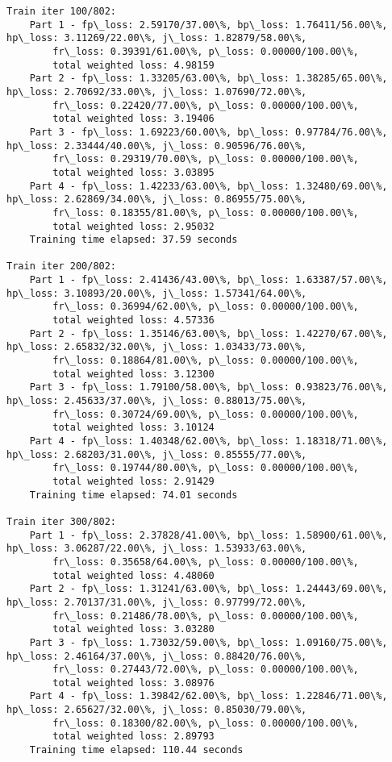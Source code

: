 \documentclass[11pt]{article}
\begin{document}
\begin{Verbatim}[commandchars=\\\{\}]
Train iter 100/802:
	Part 1 - fp\_loss: 2.59170/37.00\%, bp\_loss: 1.76411/56.00\%, hp\_loss: 3.11269/22.00\%, j\_loss: 1.82879/58.00\%, 
		fr\_loss: 0.39391/61.00\%, p\_loss: 0.00000/100.00\%, 
		total weighted loss: 4.98159
	Part 2 - fp\_loss: 1.33205/63.00\%, bp\_loss: 1.38285/65.00\%, hp\_loss: 2.70692/33.00\%, j\_loss: 1.07690/72.00\%, 
		fr\_loss: 0.22420/77.00\%, p\_loss: 0.00000/100.00\%, 
		total weighted loss: 3.19406
	Part 3 - fp\_loss: 1.69223/60.00\%, bp\_loss: 0.97784/76.00\%, hp\_loss: 2.33444/40.00\%, j\_loss: 0.90596/76.00\%, 
		fr\_loss: 0.29319/70.00\%, p\_loss: 0.00000/100.00\%, 
		total weighted loss: 3.03895
	Part 4 - fp\_loss: 1.42233/63.00\%, bp\_loss: 1.32480/69.00\%, hp\_loss: 2.62869/34.00\%, j\_loss: 0.86955/75.00\%, 
		fr\_loss: 0.18355/81.00\%, p\_loss: 0.00000/100.00\%, 
		total weighted loss: 2.95032
	Training time elapsed: 37.59 seconds

Train iter 200/802:
	Part 1 - fp\_loss: 2.41436/43.00\%, bp\_loss: 1.63387/57.00\%, hp\_loss: 3.10893/20.00\%, j\_loss: 1.57341/64.00\%, 
		fr\_loss: 0.36994/62.00\%, p\_loss: 0.00000/100.00\%, 
		total weighted loss: 4.57336
	Part 2 - fp\_loss: 1.35146/63.00\%, bp\_loss: 1.42270/67.00\%, hp\_loss: 2.65832/32.00\%, j\_loss: 1.03433/73.00\%, 
		fr\_loss: 0.18864/81.00\%, p\_loss: 0.00000/100.00\%, 
		total weighted loss: 3.12300
	Part 3 - fp\_loss: 1.79100/58.00\%, bp\_loss: 0.93823/76.00\%, hp\_loss: 2.45633/37.00\%, j\_loss: 0.88013/75.00\%, 
		fr\_loss: 0.30724/69.00\%, p\_loss: 0.00000/100.00\%, 
		total weighted loss: 3.10124
	Part 4 - fp\_loss: 1.40348/62.00\%, bp\_loss: 1.18318/71.00\%, hp\_loss: 2.68203/31.00\%, j\_loss: 0.85555/77.00\%, 
		fr\_loss: 0.19744/80.00\%, p\_loss: 0.00000/100.00\%, 
		total weighted loss: 2.91429
	Training time elapsed: 74.01 seconds

Train iter 300/802:
	Part 1 - fp\_loss: 2.37828/41.00\%, bp\_loss: 1.58900/61.00\%, hp\_loss: 3.06287/22.00\%, j\_loss: 1.53933/63.00\%, 
		fr\_loss: 0.35658/64.00\%, p\_loss: 0.00000/100.00\%, 
		total weighted loss: 4.48060
	Part 2 - fp\_loss: 1.31241/63.00\%, bp\_loss: 1.24443/69.00\%, hp\_loss: 2.70137/31.00\%, j\_loss: 0.97799/72.00\%, 
		fr\_loss: 0.21486/78.00\%, p\_loss: 0.00000/100.00\%, 
		total weighted loss: 3.03280
	Part 3 - fp\_loss: 1.73032/59.00\%, bp\_loss: 1.09160/75.00\%, hp\_loss: 2.46164/37.00\%, j\_loss: 0.88420/76.00\%, 
		fr\_loss: 0.27443/72.00\%, p\_loss: 0.00000/100.00\%, 
		total weighted loss: 3.08976
	Part 4 - fp\_loss: 1.39842/62.00\%, bp\_loss: 1.22846/71.00\%, hp\_loss: 2.65627/32.00\%, j\_loss: 0.85030/79.00\%, 
		fr\_loss: 0.18300/82.00\%, p\_loss: 0.00000/100.00\%, 
		total weighted loss: 2.89793
	Training time elapsed: 110.44 seconds


\end{Verbatim}
\end{document}
